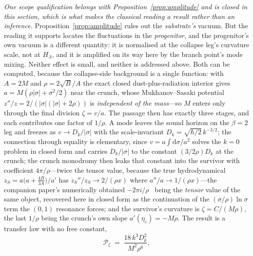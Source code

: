 \documentclass[11pt,a4paper]{article}
\theoremstyle{plain}
\theoremstyle{definition}
\theoremstyle{remark}
\begin{document}
\emph{One scope qualification belongs with Proposition~\ref{prop:amplitude} and is closed in this section, which is what makes the classical reading a result rather than an inference.} Proposition~\ref{prop:amplitude} rules out the \emph{substrate's} vacuum. But the reading it supports locates the fluctuations in the \emph{progenitor}, and the progenitor's own vacuum is a different quantity: it is normalised at the collapse leg's curvature scale, not at $H_\Lambda$, and it is amplified on its way here by the branch point's mode mixing. Neither effect is small, and neither is addressed above. Both can be computed, because the collapse-side background is a single function: with $A=2M$ and $\rho=2\sqrt B/A$ the exact closed dust-plus-radiation interior gives $a=M(\rho|\sigma|+\sigma^2/2)$ near the crunch, whose Mukhanov--Sasaki potential $z''/z=2/(|\sigma|(|\sigma|+2\rho))$ is \emph{independent of the mass}---so $M$ enters only through the final division $\zeta=v/a$. The passage then has exactly three stages, and each contributes one factor of $1/\rho$. A mode leaves the sound horizon on the $\beta=2$ leg and freezes as $v\to D_k/|\sigma|$ with the scale-invariant $D_k=\sqrt{\hbar/2}\,k^{-3/2}$; the connection through equality is elementary, since $v=a\int\!\mathrm{d}\sigma/a^2$ solves the $k=0$ problem in closed form and carries $D_k/|\sigma|$ to the constant $(3/2\rho)D_k$ at the crunch; the crunch monodromy then leaks that constant into the survivor with coefficient $4\pi/\rho$---twice the tensor value, because the true hydrodynamical $z_S=a\bigl(a+\tfrac{4B}{3A}\bigr)/a'$ has $z_S''/z_S\to2/(\rho x)$ where $a''/a\to1/(\rho x)$---the companion paper's numerically obtained $-2\pi i/\rho$~\cite{JanzenCosmogenesis} being the \emph{tensor} value of the same object, recovered here in closed form as the continuation of the $(\sigma/\rho)\ln\sigma$ term the $(0,1)$ resonance forces; and the survivor's curvature is $\zeta=C/(M\rho)$, the last $1/\rho$ being the crunch's own slope $a'(\eta_c)=-M\rho$. The result is a transfer law with no free constant,
\begin{equation}\label{eq:transfer-law}
\mathcal{P}_\zeta \;=\; \frac{18\,k^3 D_k^2}{M^2\rho^6},
\end{equation}
\end{document}

